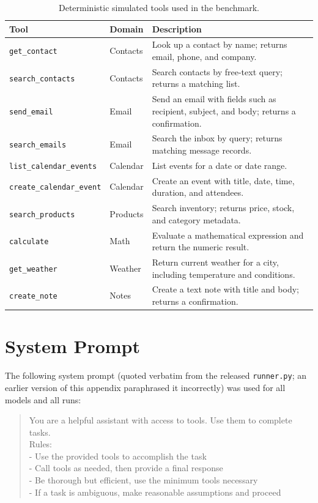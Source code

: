 \documentclass[11pt]{article}
\begin{document}
\begin{table}[t]
\centering
\small
\caption{Deterministic simulated tools used in the benchmark.}\label{tab:tools}
\begin{tabularx}{\textwidth}{@{}llX@{}}
\toprule
Tool & Domain & Description \\
\midrule
\texttt{get\_contact}            & Contacts & Look up a contact by name; returns email, phone, and company. \\
\texttt{search\_contacts}        & Contacts & Search contacts by free-text query; returns a matching list. \\
\texttt{send\_email}             & Email    & Send an email with fields such as recipient, subject, and body; returns a confirmation. \\
\texttt{search\_emails}          & Email    & Search the inbox by query; returns matching message records. \\
\texttt{list\_calendar\_events}  & Calendar & List events for a date or date range. \\
\texttt{create\_calendar\_event} & Calendar & Create an event with title, date, time, duration, and attendees. \\
\texttt{search\_products}        & Products & Search inventory; returns price, stock, and category metadata. \\
\texttt{calculate}               & Math     & Evaluate a mathematical expression and return the numeric result. \\
\texttt{get\_weather}            & Weather  & Return current weather for a city, including temperature and conditions. \\
\texttt{create\_note}            & Notes    & Create a text note with title and body; returns a confirmation. \\
\bottomrule
\end{tabularx}
\end{table}

\section{System Prompt}
\label{app:system_prompt}

The following system prompt (quoted verbatim from the released
\texttt{runner.py}; an earlier version of this appendix paraphrased it
incorrectly) was used for all models and all runs:

\begin{quote}
\small\ttfamily
You are a helpful assistant with access to tools. Use them to complete tasks.\\[2pt]
Rules:\\
- Use the provided tools to accomplish the task\\
- Call tools as needed, then provide a final response\\
- Be thorough but efficient, use the minimum tools necessary\\
- If a task is ambiguous, make reasonable assumptions and proceed
\end{quote}
\end{document}
